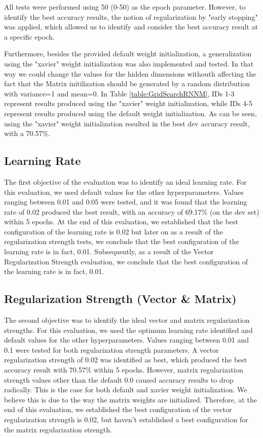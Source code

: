 \documentclass{article} %
\begin{document}
All tests were performed using 50 (0-50) as the epoch parameter. However, to identify the best accuracy results, the notion of regularization by "early stopping" was applied, which allowed us to identify and consider the best accuracy result at a specific epoch.

Furthermore, besides the provided default weight initialization, a generalization using the "xavier" weight initialization \cite{Glorot2010} \cite{he2015delving} was also implemented and tested. In that way we could change the values for the hidden dimensions withouth affecting the fact that the Matrix initilization should be generated by a random distribution with variance=1 and mean=0. In Table \ref{table:GridSearchRNNM}, IDs 1-3 represent results produced using the "xavier" weight initialization, while IDs 4-5 represent results produced using the default weight initialization. As can be seen, using the "xavier" weight initialization resulted in the best dev accuracy result, with a 70.57\%.

\subsection*{Learning Rate}

The first objective of the evaluation was to identify an ideal learning rate. For this evaluation, we used default values for the other hyperparameters. Values ranging between 0.01 and 0.05 were tested, and it was found that the learning rate of 0.02 produced the best result, with an accuracy of 69.17\% (on the dev set) within 5 epochs. At the end of this evaluation, we established that the best configuration of the learning rate is 0.02 but later on as a result of the regularization strength tests, we conclude that the best configuration of the learning rate is in fact, 0.01. Subsequently, as a result of the Vector Regularization Strength evaluation, we conclude that the best configuration of the learning rate is in fact, 0.01.

\subsection*{Regularization Strength (Vector \& Matrix)}

The second objective was to identify the ideal vector and matrix regularization strengths. For this evaluation, we used the optimum learning rate identified and default values for the other hyperparameters. Values ranging between 0.01 and 0.1 were tested for both regularization strength parameters. A vector regularization strength of 0.02 was identified as best, which produced the best accuracy result with 70.57\% within 5 epochs. However, matrix regularization strength values other than the default 0.0 caused accuracy results to drop radically. This is the case for both default and xavier weight initialization. We believe this is due to the way the matrix weights are initialized. Therefore, at the end of this evaluation, we established the best configuration of the vector regularization strength is 0.02, but haven't established a best configuration for the matrix regularization strength.
\end{document}
